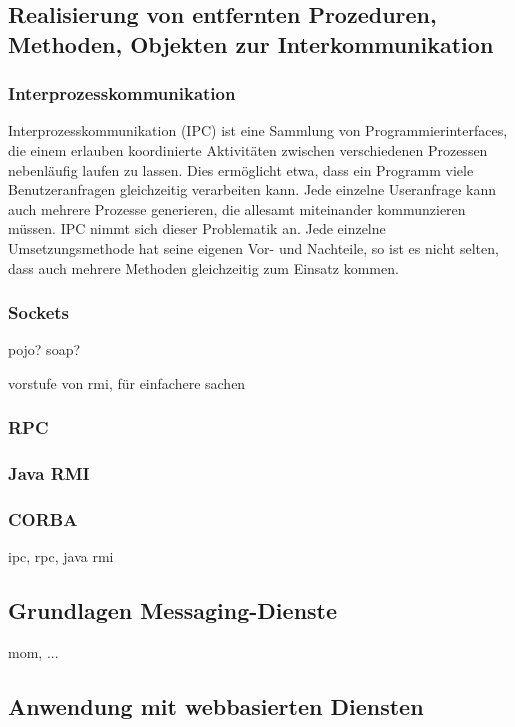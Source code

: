 \documentclass[letterpaper, 12pt]{article}
\let\tempsubsection\subsection
\renewcommand\subsection[1]{\vspace{0cm}\tempsubsection{#1}\vspace{0cm}}
\let\tempsubsubsection\subsubsection
\renewcommand\subsubsection[1]{\vspace{0cm}\tempsubsubsection{#1}\vspace{0cm}}
\begin{document}
\subsection{Realisierung von entfernten Prozeduren, Methoden, Objekten zur Interkommunikation}

\subsubsection{Interprozesskommunikation}

Interprozesskommunikation (IPC) ist eine Sammlung von Programmierinterfaces, die einem erlauben koordinierte Aktivitäten zwischen verschiedenen Prozessen nebenläufig laufen zu lassen. Dies ermöglicht etwa, dass ein Programm viele Benutzeranfragen gleichzeitig verarbeiten kann. Jede einzelne Useranfrage kann auch mehrere Prozesse generieren, die allesamt miteinander kommunzieren müssen. IPC nimmt sich dieser Problematik an. Jede einzelne Umsetzungsmethode hat seine eigenen Vor- und Nachteile, so ist es nicht selten, dass auch mehrere Methoden gleichzeitig zum Einsatz kommen.

\subsubsection{Sockets}

pojo? soap?

vorstufe von rmi, für einfachere sachen

\subsubsection{RPC}

\subsubsection{Java RMI}

\subsubsection{CORBA}

ipc, rpc, java rmi

\subsection{Grundlagen Messaging-Dienste}

mom, ...

\subsection{Anwendung mit webbasierten Diensten}
\end{document}
